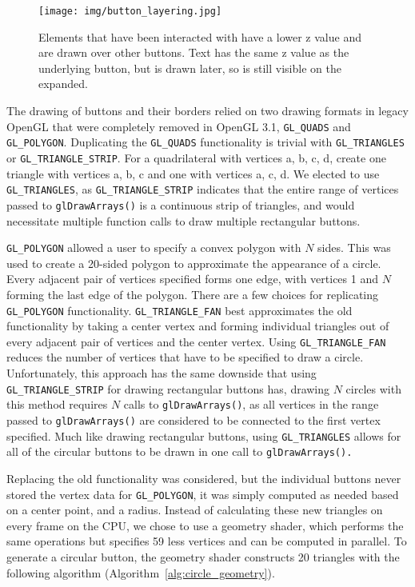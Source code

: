 \begin{figure}[htp] \centering
    \texttt{[image: img/button\_layering.jpg]}
    \caption[Button Layering]{Elements that have been interacted with have a lower z value and are drawn over other buttons. Text has the same z value as the underlying button, but is drawn later, so is still visible on the expanded.}
    \label{fig:layering_buttons}
\end{figure}

The drawing of buttons and their borders relied on two drawing formats in legacy OpenGL that were 
completely removed in OpenGL 3.1, {\tt GL\_QUADS} and {\tt GL\_POLYGON\@}. Duplicating the {\tt GL\_QUADS} functionality 
is trivial with {\tt GL\_TRIANGLES} or {\tt GL\_TRIANGLE\_STRIP\@}. For a quadrilateral with vertices a, b, 
c, d, create one triangle with vertices a, b, c and one with vertices a, c, d. We elected to 
use {\tt GL\_TRIANGLES}, as {\tt GL\_TRIANGLE\_STRIP} indicates that the entire range of vertices passed to
{\tt glDrawArrays()} is a continuous strip of triangles, and would necessitate multiple function 
calls to draw multiple rectangular buttons.

{\tt GL\_POLYGON} allowed a user to specify a convex polygon with $N$ sides. This was used to create 
a 20-sided polygon to approximate the appearance of a circle. Every adjacent pair of vertices 
specified forms one edge, with vertices 1 and $N$ forming the last edge of the polygon. There are a few choices for replicating {\tt GL\_POLYGON} functionality. {\tt GL\_TRIANGLE\_FAN} best approximates 
the old functionality by taking a center vertex and forming individual triangles out of every 
adjacent pair of vertices and the center vertex. Using {\tt GL\_TRIANGLE\_FAN} reduces the number of vertices that have to be specified to draw a circle. Unfortunately, this approach has the same 
downside that using {\tt GL\_TRIANGLE\_STRIP} for drawing rectangular buttons has, drawing $N$ circles 
with this method requires $N$ calls to {\tt glDrawArrays()}, as all vertices in the range passed to {\tt glDrawArrays()} are considered to be connected to the first vertex specified. Much like drawing rectangular buttons, using {\tt GL\_TRIANGLES}
allows for all of the circular buttons to be drawn in one call to {\tt glDrawArrays().}

Replacing the old functionality was considered, but the individual buttons never stored the 
vertex data for {\tt GL\_POLYGON}, it was simply computed as needed based on a center point, and a 
radius. Instead of calculating these new triangles on every frame on the CPU, we chose to use a geometry 
shader, which performs the same operations but specifies 59 less vertices and can be computed in parallel. To generate a circular button, the geometry shader constructs 20 triangles with the 
following algorithm (Algorithm~\ref{alg:circle_geometry}). 

